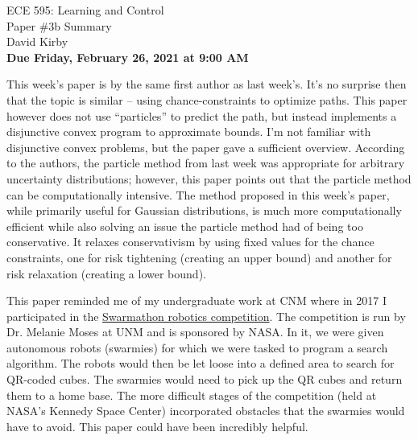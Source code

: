 \documentclass[11pt]{article}
\begin{document}
\begin{center}
\LARGE{ECE 595: Learning and Control\\Paper \#3b Summary}\\[1.5em]
\large David Kirby\\[1.5em]
\large \textbf{Due Friday, February 26, 2021 at 9:00 AM}\\[2.5em]
\end{center}

\noindent This week's paper is by the same first author as last week's. It's no surprise then that the topic is similar -- using chance-constraints to optimize paths. This paper however does not use ``particles'' to predict the path, but instead implements a disjunctive convex program to approximate bounds. I'm not familiar with disjunctive convex problems, but the paper gave a sufficient overview. According to the authors, the particle method from last week was appropriate for arbitrary uncertainty distributions; however, this paper points out that the particle method can be computationally intensive. The method proposed in this week's paper, while primarily useful for Gaussian distributions, is much more computationally efficient while also solving an issue the particle method had of being too conservative. It relaxes conservativism by using fixed values for the chance constraints, one for risk tightening (creating an upper bound) and another for risk relaxation (creating a lower bound).

This paper reminded me of my undergraduate work at CNM where in 2017 I participated in the \href{http://nasaswarmathon.com}{Swarmathon robotics competition}. The competition is run by Dr. Melanie Moses at UNM and is sponsored by NASA. In it, we were given autonomous robots (swarmies) for which we were tasked to program a search algorithm. The robots would then be let loose into a defined area to search for QR-coded cubes. The swarmies would need to pick up the QR cubes and return them to a home base. The more difficult stages of the competition (held at NASA's Kennedy Space Center) incorporated obstacles that the swarmies would have to avoid. This paper could have been incredibly helpful.
\end{document}
